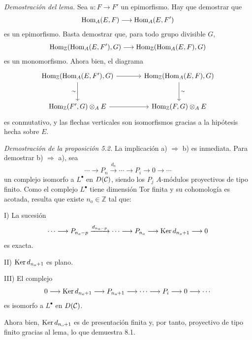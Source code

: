 \emph{Demostración del lema.} Sea $u:F\to F'$ un epimorfismo. Hay que demostrar que
\[
\operatorname{Hom}_A(E,F)\longrightarrow\operatorname{Hom}_A(E,F')
\]
es un epimorfismo. Basta demostrar que, para todo grupo divisible $G$,
\[
\operatorname{Hom}_{\mathbb Z}(\operatorname{Hom}_A(E,F'),G)\longrightarrow
\operatorname{Hom}_{\mathbb Z}(\operatorname{Hom}_A(E,F),G)
\]
es un monomorfismo. Ahora bien, el diagrama
\[
\begin{tikzcd}[column sep=large,row sep=large]
\Hom_{\mathbb Z}(\Hom_A(E,F'),G)
 \arrow[r]\arrow[d,"\sim"']&
\Hom_{\mathbb Z}(\Hom_A(E,F),G)\arrow[d,"\sim"]\\
\Hom_{\mathbb Z}(F',G)\otimes_A E
 \arrow[r]&
\Hom_{\mathbb Z}(F,G)\otimes_A E
\end{tikzcd}
\]
es conmutativo, y las flechas verticales son isomorfismos gracias a la hipótesis hecha sobre $E$.

\emph{Demostración de la proposición 5.2.} La implicación a) $\Rightarrow$ b) es inmediata. Para demostrar b) $\Rightarrow$ a), sea
\[
\cdots\longrightarrow P_n\xrightarrow{d_n}\cdots\longrightarrow P_i\longrightarrow 0\longrightarrow\cdots
\]
un complejo isomorfo a $L^\bullet$ en $D(\mathcal C)$, siendo los $P_j$ $A$-módulos proyectivos de tipo finito. Como el complejo $L^\bullet$ tiene dimensión Tor finita y su cohomología es acotada, resulta que existe $n_o\in\mathbb Z$ tal que:

I) La sucesión
\[
\cdots\longrightarrow P_{n_o-p}\xrightarrow{d_{n_o-p}}\cdots\longrightarrow
P_{n_o}\longrightarrow \operatorname{Ker} d_{n_o+1}\longrightarrow0
\]
es exacta.

II) $\operatorname{Ker} d_{n_o+1}$ es plano.

III) El complejo
\[
0\longrightarrow \operatorname{Ker} d_{n_o+1}\longrightarrow P_{n_o+1}\longrightarrow\cdots\longrightarrow P_i\longrightarrow0\longrightarrow\cdots
\]
es isomorfo a $L^\bullet$ en $D(\mathcal C)$.

Ahora bien, $\operatorname{Ker} d_{n_o+1}$ es de presentación finita y, por tanto, proyectivo de tipo finito gracias al lema, lo que demuestra 8.1.
